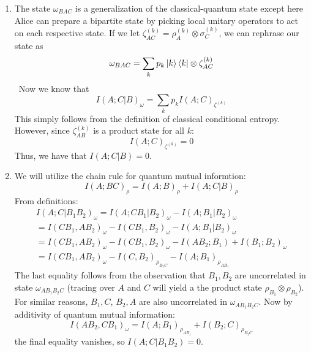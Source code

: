 \documentclass[12pt]{article}%
\begin{document}
\begin{enumerate}
  \item The state $\omega_{BAC}$ is a generalization of the classical-quantum state except here Alice can prepare a bipartite state by picking local unitary operators to act on each respective state. If we let $\zeta_{AC}^{(k)} = \rho_A^{(k)} \otimes \sigma_C^{(k)}$, we can rephrase our state as
  $$\omega_{BAC} = \sum_{k} p_k \ket{k}\bra{k} \otimes \zeta_{AC}^{(k)} $$\
  Now we know that
  $$ I(A;C\vert B)_{\omega} = \sum_k p_k I(A;C)_{\zeta^{(k)}} $$ This simply follows from the definition of classical conditional entropy. However, since $\zeta^{(k)}_{AB}$ is a product state for all $k$:
  $$ I(A;C)_{\zeta^{(k)}} = 0 $$
  Thus, we have that $I(A;C\vert B) = 0$.
  \item
  We will utilize the chain rule for quantum mutual informtion:
  \begin{equation*}
    I(A;BC)_{\rho} = I(A;B)_{\rho} + I(A;C\vert B)_\rho
  \end{equation*}
  From definitions:
  \begin{gather*}
    I(A;C\vert B_1B_2)_\omega = I(A;CB_1\vert B_2)_\omega - I(A;B_1 \vert B_2)_\omega \\
    = I(CB_1,AB_2)_\omega - I(CB_1,B_2)_\omega - I(A;B_1\vert B_2)_\omega \\
    = I(CB_1,AB_2)_\omega - I(CB_1,B_2)_\omega - I(AB_2;B_1) + I(B_1;B_2)_\omega \\
    = I(CB_1,AB_2)_\omega - I(C,B_2)_{\rho_{B_2C}} - I(A;B_1)_{\rho_{AB_1}}
  \end{gather*}
  The last equality follows from the observation that $B_1,B_2$ are uncorrelated in state $\omega_{AB_1B_2C}$ (tracing over $A$ and $C$ will yield a the product state $\rho_{B_1} \otimes \rho_{B_2}$). For similar reasons, $B_1,C$, $B_2,A$ are also uncorrelated in $\omega_{AB_1B_2C}$.
  Now by additivity of quantum mutual information:
  \begin{equation*}
    I(AB_2,CB_1)_{\omega} = I(A;B_1)_{\rho_{AB_1}} + I(B_2;C)_{\rho_{B_2C}}
  \end{equation*}
  the final equality vanishes, so $I(A;C \vert B_1B_2) = 0$.
\end{enumerate}
\end{document}

